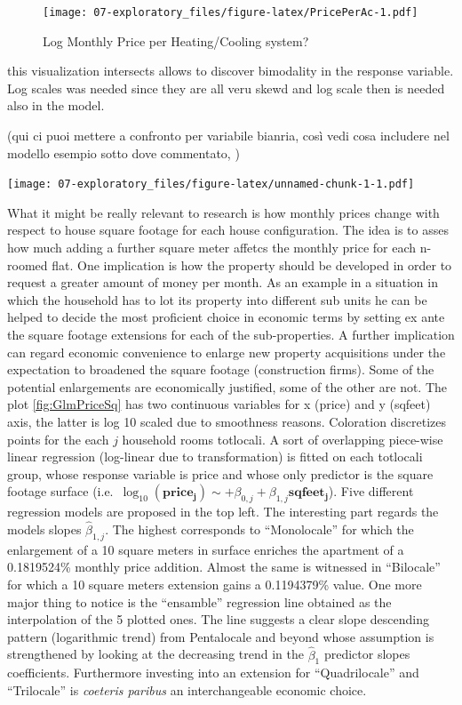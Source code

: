 \documentclass[
  12pt,
  a4paper,
  oneside]{book}
\theoremstyle{definition}
\theoremstyle{definition}
\theoremstyle{definition}
\theoremstyle{remark}
\begin{document}
\begin{figure}
\centering
\texttt{[image: 07-exploratory\_files/figure-latex/PricePerAc-1.pdf]}
\caption{\label{fig:PricePerAc}Log Monthly Price per Heating/Cooling system?}
\end{figure}

this visualization intersects allows to discover bimodality in the response variable. Log scales was needed since they are all veru skewd and log scale then is needed also in the model.

(qui ci puoi mettere a confronto per variabile bianria, così vedi cosa includere nel modello esempio sotto dove commentato, )

\texttt{[image: 07-exploratory\_files/figure-latex/unnamed-chunk-1-1.pdf]}

What it might be really relevant to research is how monthly prices change with respect to house square footage for each house configuration. The idea is to asses how much adding a further square meter affetcs the monthly price for each n-roomed flat.
One implication is how the property should be developed in order to request a greater amount of money per month. As an example in a situation in which the household has to lot its property into different sub units he can be helped to decide the most proficient choice in economic terms by setting ex ante the square footage extensions for each of the sub-properties.
A further implication can regard economic convenience to enlarge new property acquisitions under the expectation to broadened the square footage (construction firms). Some of the potential enlargements are economically justified, some of the other are not.
The plot \ref{fig:GlmPriceSq} has two continuous variables for x (price) and y (sqfeet) axis, the latter is log 10 scaled due to smoothness reasons. Coloration discretizes points for the each \(j\) household rooms totlocali. A sort of overlapping piece-wise linear regression (log-linear due to transformation) is fitted on each totlocali group, whose response variable is price and whose only predictor is the square footage surface (i.e.~\(\log_{10}(\mathbf{price_j}) \sim +\beta_{0,j}+\beta_{1,j}\mathbf{sqfeet_j}\)). Five different regression models are proposed in the top left. The interesting part regards the models slopes \(\hat\beta_{1,j}\). The highest corresponds to ``Monolocale'' for which the enlargement of a 10 square meters in surface enriches the apartment of a 0.1819524\% monthly price addition. Almost the same is witnessed in ``Bilocale'' for which a 10 square meters extension gains a 0.1194379\% value. One more major thing to notice is the ``ensamble'' regression line obtained as the interpolation of the 5 plotted ones. The line suggests a clear slope descending pattern (logarithmic trend) from Pentalocale and beyond whose assumption is strengthened by looking at the decreasing trend in the \(\hat\beta_1\) predictor slopes coefficients. Furthermore investing into an extension for ``Quadrilocale'' and ``Trilocale'' is \emph{coeteris paribus} an interchangeable economic choice.
\end{document}
